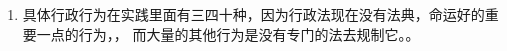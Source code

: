 \begin{enumerate}
\begin{enumerate}
\begin{enumerate}
                \end{enumerate}
          \item 可撤销。撤销前有效、可溯及既往、要。
          \item 废止。行为。等。废止之日失效 +  + 不溯及既往。
          \item 其他原因。。
        \end{enumerate}
  \item 具体行政行为在实践里面有三四十种，因为行政法现在没有法典，命运好的重要一点的行为，，
        而大量的其他行为是没有专门的法去规制它。。
\end{enumerate}
